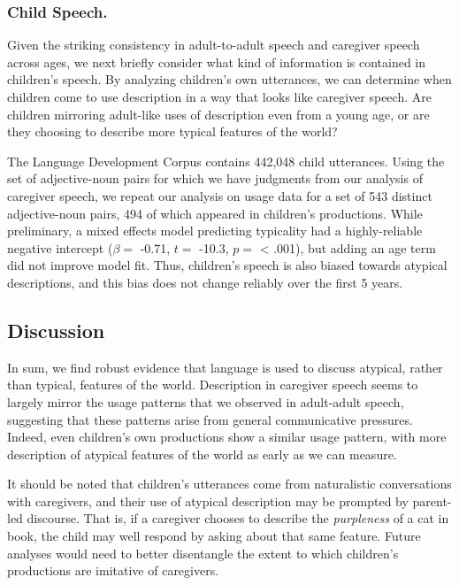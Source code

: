 \documentclass[10pt, letterpaper]{article}
\begin{document}
\hypertarget{child-speech.}{%
\subsubsection{Child Speech.}\label{child-speech.}}

Given the striking consistency in adult-to-adult speech and caregiver
speech across ages, we next briefly consider what kind of information is
contained in children's speech. By analyzing children's own utterances,
we can determine when children come to use description in a way that
looks like caregiver speech. Are children mirroring adult-like uses of
description even from a young age, or are they choosing to describe more
typical features of the world?

The Language Development Corpus contains 442,048 child utterances. Using
the set of adjective-noun pairs for which we have judgments from our
analysis of caregiver speech, we repeat our analysis on usage data for a
set of 543 distinct adjective-noun pairs, 494 of which appeared in
children's productions. While preliminary, a mixed effects model
predicting typicality had a highly-reliable negative intercept
(\(\beta =\) -0.71, \(t =\) -10.3, \(p =\) \textless{} .001), but adding
an age term did not improve model fit. Thus, children's speech is also
biased towards atypical descriptions, and this bias does not change
reliably over the first 5 years.

\hypertarget{discussion}{%
\subsection{Discussion}\label{discussion}}

In sum, we find robust evidence that language is used to discuss
atypical, rather than typical, features of the world. Description in
caregiver speech seems to largely mirror the usage patterns that we
observed in adult-adult speech, suggesting that these patterns arise
from general communicative pressures. Indeed, even children's own
productions show a similar usage pattern, with more description of
atypical features of the world as early as we can measure.

It should be noted that children's utterances come from naturalistic
conversations with caregivers, and their use of atypical description may
be prompted by parent-led discourse. That is, if a caregiver chooses to
describe the \emph{purpleness} of a cat in book, the child may well
respond by asking about that same feature. Future analyses would need to
better disentangle the extent to which children's productions are
imitative of caregivers.
\end{document}
